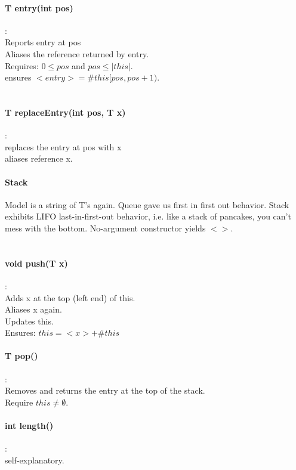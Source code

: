 \documentclass[10pt]{article}
\begin{document}
\paragraph{T entry(int pos)}:\\
Reports entry at pos\\
Aliases the reference returned by entry. \\
Requires: $0 \leq pos$ and $pos \leq |this|$. \\
ensures $<entry> = \#this[pos, pos+1)$. \\\\
\paragraph{T replaceEntry(int pos, T x)}:\\
replaces the entry at pos with x\\
aliases reference x. \\

\paragraph{Stack} Model is a string of T's again. Queue gave us first in first out behavior. Stack exhibits LIFO last-in-first-out behavior, i.e. like a stack of pancakes, you can't mess with the bottom. 
No-argument constructor yields $<>$. \\\\
\paragraph{void push(T x)}:\\
Adds x at the top (left end) of this. \\
Aliases x again.\\
Updates this.\\
Ensures: $this = <x> + \#this$\\
\paragraph{T pop()}:\\
Removes and returns the entry at the top of the stack. \\
Require $this \neq \emptyset$. \\
\paragraph{int length()}:\\
self-explanatory.\\
\end{document}
